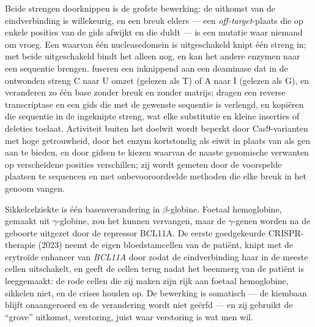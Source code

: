 \begin{proposition}\label{prop:b3:genetic-engineering:editors}
Beide strengen doorknippen is de grofste bewerking: de uitkomst van de
eindverbinding is willekeurig, en een breuk elders --- een
\emph{off-target}-plaats die op enkele posities van de gids afwijkt en
die  duldt --- is een mutatie waar niemand om vroeg. Een 
waarvan één nucleasedomein is uitgeschakeld knipt één streng in; met
beide uitgeschakeld bindt het alleen nog, en kan het andere enzymen
naar een sequentie brengen. \emph{} fuseren een inknippend
 aan een deaminase dat in de ontwonden streng C naar U omzet
(gelezen als T) of A naar I (gelezen als G), en veranderen zo één base
zonder breuk en zonder matrijs; \emph{} dragen een
reverse transcriptase en een gids die met de gewenste sequentie is
verlengd, en kopiëren die sequentie in de ingeknipte streng, wat elke
substitutie en kleine inserties of deleties toelaat. Activiteit buiten
het doelwit wordt beperkt door Cas9-varianten met hoge getrouwheid, door
het enzym kortstondig als eiwit in plaats van als gen aan te bieden, en
door gidsen te kiezen waarvan de naaste genomische verwanten op
verscheidene posities verschillen; zij wordt gemeten door de voorspelde
plaatsen te sequencen en met onbevooroordeelde methoden die elke breuk
in het genoom vangen.
\end{proposition}

\begin{example}\label{ex:b3:genetic-engineering:sickle}
Sikkelcelziekte is één basenverandering in $\beta$-globine. Foetaal
hemoglobine, gemaakt uit $\gamma$-globine, zou het kunnen vervangen,
maar de $\gamma$-genen worden na de geboorte uitgezet door de repressor
BCL11A. De eerste goedgekeurde CRISPR-therapie (2023) neemt de eigen
bloedstamcellen van de patiënt, knipt met  de erytroïde enhancer
van \emph{BCL11A} door zodat de eindverbinding haar in de meeste cellen
uitschakelt, en geeft de cellen terug nadat het beenmerg van de patiënt
is leeggemaakt: de rode cellen die zij maken zijn rijk aan foetaal
hemoglobine, sikkelen niet, en de crises houden op. De bewerking is
somatisch --- de kiembaan blijft onaangeroerd en de verandering wordt
niet geërfd --- en zij gebruikt de ``grove'' uitkomst, verstoring,
juist waar verstoring is wat men wil.
\end{example}


